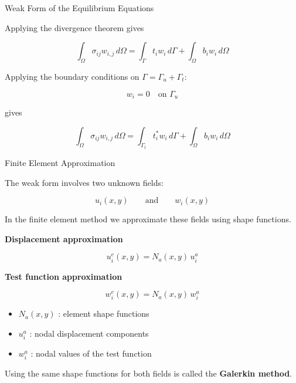 \documentclass[aspectratio=169]{beamer}
\begin{document}
\begin{frame}{Weak Form of the Equilibrium Equations}

Applying the divergence theorem gives

\[
\int_\Omega
\sigma_{ij} w_{i,j}\, d\Omega
=
\int_{\Gamma}
t_i w_i\, d\Gamma
+
\int_\Omega
b_i w_i\, d\Omega
\]

Applying the boundary conditions on $\Gamma = \Gamma_u + \Gamma_t$:

\[
w_i = 0 \quad \text{on } \Gamma_u
\]

gives

\[
\boxed{
\int_\Omega
\sigma_{ij} w_{i,j}\, d\Omega
=
\int_{\Gamma_t}
t_i^* w_i\, d\Gamma
+
\int_\Omega
b_i w_i\, d\Omega
}
\]

\end{frame}
\begin{frame}{Finite Element Approximation}

The weak form involves two unknown fields:

\[
u_i(x,y) \qquad \text{and} \qquad w_i(x,y)
\]

In the finite element method we approximate these fields
using shape functions.

\bigskip

\textbf{Displacement approximation}

\[
u_i^e(x,y) = N_a(x,y)\, u_i^a
\]

\textbf{Test function approximation}

\[
w_i^e(x,y) = N_a(x,y)\, w_i^a
\]

\bigskip

\begin{itemize}
\item $N_a(x,y)$ : element shape functions
\item $u_i^a$ : nodal displacement components
\item $w_i^a$ : nodal values of the test function
\end{itemize}

Using the same shape functions for both fields is called
the \textbf{Galerkin method}.

\end{frame}
\end{document}
